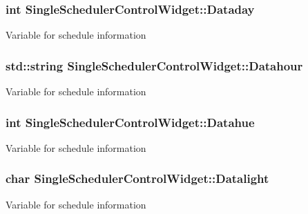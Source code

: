 \subsubsection[{\texorpdfstring{Dataday}{Dataday}}]{\setlength{\rightskip}{0pt plus 5cm}int Single\+Scheduler\+Control\+Widget\+::\+Dataday\hspace{0.3cm}{\ttfamily [private]}}\hypertarget{classSingleSchedulerControlWidget_a8d3a1c66c75980878c35700a6544ae94}{}\label{classSingleSchedulerControlWidget_a8d3a1c66c75980878c35700a6544ae94}
Variable for schedule information 
\subsubsection[{\texorpdfstring{Datahour}{Datahour}}]{\setlength{\rightskip}{0pt plus 5cm}std\+::string Single\+Scheduler\+Control\+Widget\+::\+Datahour\hspace{0.3cm}{\ttfamily [private]}}\hypertarget{classSingleSchedulerControlWidget_a7141fd690ac8ad3db9f4539763ad3db9}{}\label{classSingleSchedulerControlWidget_a7141fd690ac8ad3db9f4539763ad3db9}
Variable for schedule information 
\subsubsection[{\texorpdfstring{Datahue}{Datahue}}]{\setlength{\rightskip}{0pt plus 5cm}int Single\+Scheduler\+Control\+Widget\+::\+Datahue\hspace{0.3cm}{\ttfamily [private]}}\hypertarget{classSingleSchedulerControlWidget_af7d9c967a6a0fc8621e5fbdc5884e91b}{}\label{classSingleSchedulerControlWidget_af7d9c967a6a0fc8621e5fbdc5884e91b}
Variable for schedule information 
\subsubsection[{\texorpdfstring{Datalight}{Datalight}}]{\setlength{\rightskip}{0pt plus 5cm}char Single\+Scheduler\+Control\+Widget\+::\+Datalight\hspace{0.3cm}{\ttfamily [private]}}\hypertarget{classSingleSchedulerControlWidget_a655b725e6a6bc0146dbb4b6210c3e6d6}{}\label{classSingleSchedulerControlWidget_a655b725e6a6bc0146dbb4b6210c3e6d6}
Variable for schedule information 
